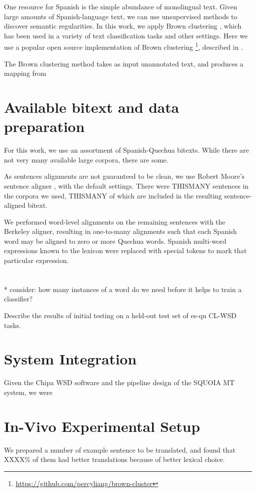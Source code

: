 \documentclass[10pt, a4paper]{article}
\begin{document}
One resource for Spanish is the simple abundance of monolingual text. Given
large amounts of Spanish-language text, we can use unsupervised methods to
discover semantic regularities. In this work, we apply Brown clustering
\cite{Brown92class-basedn-gram}, which has been used in a variety of text
classification tasks and other settings. Here we use a popular open source
implementation of Brown clustering
\footnote{\url{https://github.com/percyliang/brown-cluster}}, described in
\cite{Liang05semi-supervisedlearning}.

The Brown clustering method takes as input unannotated text, and produces a
mapping from 

\section{Available bitext and data preparation}
For this work, we use an assortment of Spanish-Quechua bitexts.
While there are not very many available large corpora, there are some.

As sentences alignments are not guaranteed to be clean, we use Robert Moore's
sentence aligner \cite{DBLP:conf/amta/Moore02}, with the default settings.
There were THISMANY sentences in the corpora we used, THISMANY of which are
included in the resulting sentence-aligned bitext.

We performed word-level alignments on the remaining sentences with the Berkeley
aligner, resulting in one-to-many alignments such that each Spanish word may be
aligned to zero or more Quechua words. Spanish multi-word expressions known to
the lexicon were replaced with special tokens to mark that particular
expression.

\section{}
* consider: how many instances of a word do we need before it helps to train a
classifier?


Describe the results of initial testing on a held-out test set of es-qu CL-WSD
tasks.

\section{System Integration}
Given the Chipa WSD software and the pipeline design of the SQUOIA MT system,
we were

\section{In-Vivo Experimental Setup}
We prepared a number of example sentence to be translated, and found that
XXXX\% of them had better translations because of better lexical choice.
\end{document}
